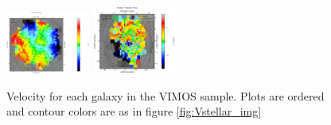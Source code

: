 \begin{figure}
      \includegraphics[width=0.245\textwidth]{Vmaps/ngc1399_stellar_vel.png}
      \includegraphics[width=0.245\textwidth]{Vmaps/eso443-g024_stellar_vel.png}
      \caption[VIMOS velocity maps]{Velocity for each galaxy in the VIMOS sample. Plots are ordered and contour colors are as in figure \ref{fig:Vstellar_img}}
      \label{fig:Vstellar_vel}
\end{figure}

